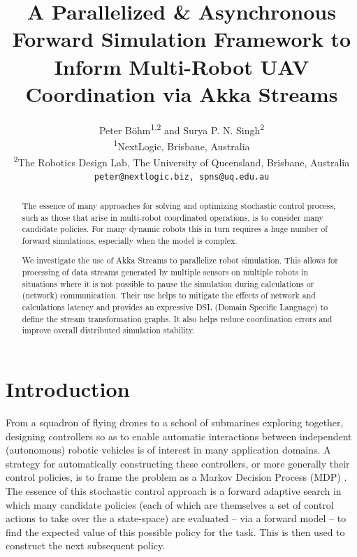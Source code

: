 \documentclass{article}
\title{A Parallelized \& Asynchronous Forward Simulation Framework to Inform Multi-Robot UAV Coordination via Akka Streams}
\author{Peter Böhm\textsuperscript{1,2} and Surya P. N. Singh\textsuperscript{2}
\\ \textsuperscript{1}NextLogic, Brisbane, Australia
\\ \textsuperscript{2}The Robotics Design Lab, The University of Queensland, Brisbane, Australia
\\ {\texttt{peter@nextlogic.biz, spns@uq.edu.au}}}
\let\cite\citep
\begin{document}
\maketitle

\begin{abstract}
The essence of many approaches for solving and optimizing stochastic control process, such as those that arise in multi-robot coordinated operations, is to consider many candidate policies.  For many dynamic robots this in turn requires a huge number of forward simulations, especially when the model is complex.

We investigate the use of Akka Streams to parallelize robot simulation. This allows for processing of data streams generated by multiple sensors on multiple robots in situations where it is not possible to pause the simulation during calculations or (network) communication. 
Their use helps to mitigate the effects of network and calculations latency and provides an expressive DSL (Domain Specific Language) to define the stream transformation graphs.  It also helps reduce coordination errors and improve overall distributed simulation stability.  
\end{abstract}


\section{Introduction}

From a squadron of flying drones to a school of submarines exploring together, designing controllers so as to enable automatic interactions between independent (autonomous) robotic vehicles is of interest in many application domains.  A strategy for automatically constructing these controllers, or more generally their control policies, is to frame the problem as a Markov Decision Process (MDP) \cite{howard1960dynamic}.  The essence of this stochastic control approach is a forward adaptive search in which many candidate {policies} (each of which are themselves a set of control actions to take over the a state-space) are evaluated -- via a forward model -- to find the expected value of this possible policy for the task.  This is then used to construct the next subsequent policy.
\end{document}
